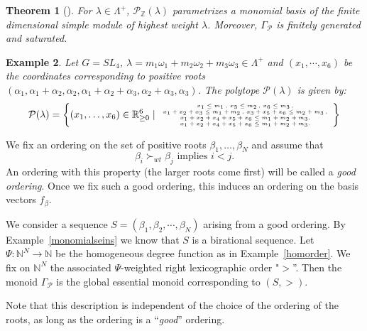 \documentclass{emsprocart}
\newtheorem{theorem}{Theorem}[section]
\newtheorem{example}[theorem]{Example}
\theoremstyle{definition}
\begin{document}
\begin{theorem}[\cite{FFL2}]
For $\lambda \in \Lambda^+$, $\mathcal{P}_{\mathbb{Z}}(\lambda)$ parametrizes a monomial basis of the finite dimensional simple module of highest weight $\lambda$. Moreover, $\Gamma_\mathcal{P}$ is finitely generated and saturated.
\end{theorem}
\begin{example}\label{Ex:FFLSL4}
Let $G = SL_4$, $\lambda = m_1 \omega_1 + m_2 \omega_2 + m_3 \omega_3\in\Lambda^+$ and $(x_1,\cdots,x_6)$ be the coordinates corresponding to positive roots $(\alpha_1, \alpha_{1} + \alpha_2, \alpha_2 , \alpha_1 + \alpha_2 +\alpha_3 , \alpha_2+\alpha_3, \alpha_3)$. The polytope $\mathcal{P}(\lambda)$ is given by:
$$
\mathcal{P}(\lambda) =  \left\{  (x_1,\ldots,x_6) \in  \mathbb R_{\ge 0}^6 \mid 
{\tiny
\begin{array}{c} x_1 \leq m_1 \, , \, x_3 \leq m_2 \, ,\, x_6 \leq m_3  \, ,  \\  x_1 + x_2 + x_3 \leq m_1 + m_2 \, , \, x_3  + x_5 + x_6 \leq m_2 + m_3  \, , \\ x_1 + x_2  + x_4 + x_5  + x_6 \leq m_1 + m_2  + m_3 , \\ x_1 + x_2 + x_4  + x_5  + x_6 \leq m_1  + m_2  + m_3.
\end{array}
}\right\}
$$
\end{example}


We fix an ordering on the set of positive roots $\beta_1,\dots,\beta_N$ and assume that
\[
\beta_i\succ_{wt} \beta_j \text{ implies } i<j.
\]
An ordering with this property (the larger roots come first) will be called a {\it good ordering}.
Once we fix such a good ordering, this induces an ordering on the basis vectors $f_\beta$.
\par
We consider a sequence $S=(\beta_1,\beta_2,\cdots,\beta_N)$ arising from a good ordering. 
By Example~\ref{monomialseins} we know that
$S$ is a birational sequence. Let $\Psi:\mathbb N^N\rightarrow \mathbb N$ be the homogeneous degree function
as in Example~\ref{homorder}. We fix on $\mathbb N^N$ the associated  $\Psi$-weighted right 
lexicographic order "$>$''. Then the monoid $\Gamma_\mathcal{P}$ is the global essential monoid corresponding to $(S, >)$.
\par
Note that this description is independent of the choice of the ordering of the roots, as long as the ordering is a ``{\it good\/}'' ordering.
\end{document}
